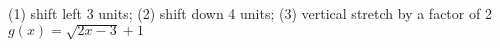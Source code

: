 {(1) shift left 3 units; (2) shift down 4 units; (3) vertical stretch by a factor of 2}
{$g(x) = \sqrt{2x-3} + 1$}